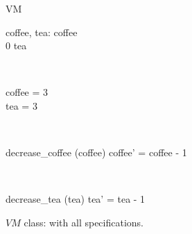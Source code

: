 \begin{itemize}
\begin{figure}[H]
\centering
\begin{class}{VM}
\\
\begin{state}
coffee, tea: \integer
{} \leq  coffee 
\\
0 \leq  tea 
\end{state} 
\\
\begin{init}
coffee = 3
\\tea = 3
\end{init} 
\\
\begin{op}{decrease\_coffee}
\Delta (coffee)
\ST
coffee' = coffee - 1
\end{op}
\\
\begin{op}{decrease\_tea}
\Delta (tea)
\ST
tea' = tea - 1
\end{op}
\end{class}
\caption{$VM$ class: with all specifications.}
\label{oz_VM_op_coffee_tea}
\end{figure}

\end{itemize}
